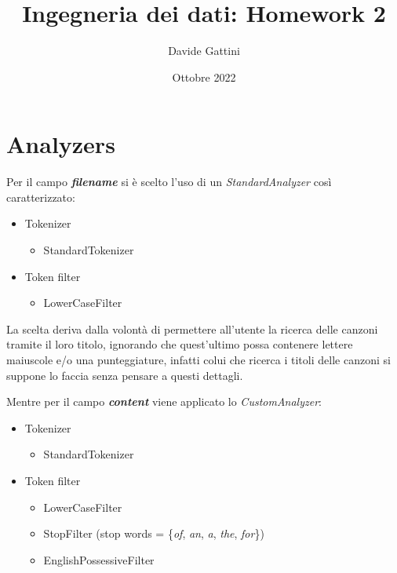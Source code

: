 \documentclass{article}
\title{Ingegneria dei dati: Homework 2}
\author{Davide Gattini}
\date{Ottobre 2022}
\begin{document}
\maketitle

\section{Analyzers}
Per il campo \textbf{\textit{filename}} si è scelto l'uso di un \textit{StandardAnalyzer} così caratterizzato:
\begin{itemize}
	\item Tokenizer
	\begin{itemize}
		\item StandardTokenizer
	\end{itemize}
	\item Token filter
	\begin{itemize}
		\item LowerCaseFilter
	\end{itemize}
\end{itemize}

La scelta deriva dalla volontà di permettere all'utente la ricerca delle canzoni tramite il loro titolo, ignorando che quest'ultimo possa contenere lettere maiuscole e/o una punteggiature, infatti colui che ricerca i titoli delle canzoni si suppone lo faccia senza pensare a questi dettagli. 
\iffalse
e qualora non si facessero queste considerazioni, i documenti cui titoli hanno punteggiatura o maiuscole, non verranno trovati dal programma a meno che l'utente non sappia dove esse si trovano. 
\fi

Mentre per il campo \textbf{\textit{content}} viene applicato lo \textit{CustomAnalyzer}:
\begin{itemize}
	\item Tokenizer
	\begin{itemize}
		\item StandardTokenizer
	\end{itemize}
	\item Token filter
	\begin{itemize}
		\item LowerCaseFilter
		\item StopFilter (stop words = \{\textit{of}, \textit{an}, \textit{a}, \textit{the}, \textit{for}\})
        \item EnglishPossessiveFilter
	\end{itemize}
\end{itemize}
\end{document}
